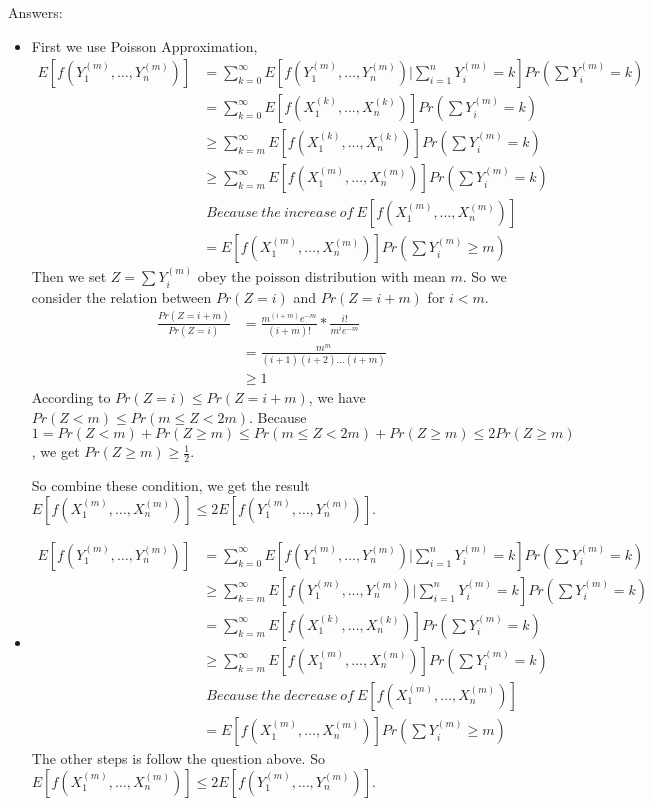 \documentclass[12pt]{article}
\begin{document}
Answers:
\begin{itemize}
\item First we use Poisson Approximation,
\begin{equation}
    \begin{split}
    E[f(Y_1^{(m)}, \dots, Y_n^{(m)})] &= \sum_{k=0}^{\infty} E[f(Y_1^{(m)}, \dots, Y_n^{(m)}) | \sum_{i=1}^{n}Y_{i}^{(m)}=k] Pr(\sum Y_i^{(m)} = k)\\
    &= \sum_{k=0}^{\infty} E[f(X_1^{(k)}, \dots, X_n^{(k)})] Pr(\sum Y_i^{(m)} = k)\\
    &\ge \sum_{k=m}^{\infty} E[f(X_1^{(k)}, \dots, X_n^{(k)})] Pr(\sum Y_i^{(m)} = k)\\
    &\ge \sum_{k=m}^{\infty} E[f(X_1^{(m)}, \dots, X_n^{(m)})] Pr(\sum Y_i^{(m)} = k) \\
    &\; Because\ the\ increase\ of\ E[f(X_1^{(m)}, \dots, X_n^{(m)})]\\
    &= E[f(X_1^{(m)}, \dots, X_n^{(m)})] Pr(\sum Y_i^{(m)} \ge m)
    \end{split}
\end{equation}
Then we set $Z = \sum Y_i^{(m)}$ obey the poisson distribution with mean $m$. So we consider the relation between $Pr(Z=i)$ and $Pr(Z=i+m)$ for $i<m$.
\begin{equation}
    \begin{split}
    \frac{Pr(Z=i+m)}{Pr(Z=i)} &= \frac{m^(i+m) e^{-m}}{(i+m)!} * \frac{i!}{m^i e^{-m}}\\
    &= \frac{m^m}{(i+1)(i+2)\dots(i+m)} \\
    &\ge 1
    \end{split}
\end{equation}
According to $Pr(Z=i) \le Pr(Z=i+m)$, we have $Pr(Z<m) \le Pr(m \le Z < 2m)$.
Because $1=Pr(Z<m) + Pr(Z\ge m)\le Pr(m \le Z < 2m) + Pr(Z\ge m) \le 2Pr(Z\ge m)$, we get $Pr(Z\ge m) \ge \frac{1}{2}$.

So combine these condition, we get the result $E[f(X_1^{(m)}, \dots, X_n^{(m)})] \le 2E[f(Y_1^{(m)}, \dots, Y_n^{(m)})]$.

\item
\begin{equation}
    \begin{split}
    E[f(Y_1^{(m)}, \dots, Y_n^{(m)})] &= \sum_{k=0}^{\infty} E[f(Y_1^{(m)}, \dots, Y_n^{(m)}) | \sum_{i=1}^{n}Y_{i}^{(m)}=k] Pr(\sum Y_i^{(m)} = k)\\
    &\ge \sum_{k=m}^{\infty} E[f(Y_1^{(m)}, \dots, Y_n^{(m)}) | \sum_{i=1}^{n}Y_{i}^{(m)}=k] Pr(\sum Y_i^{(m)} = k)\\
    &= \sum_{k=m}^{\infty} E[f(X_1^{(k)}, \dots, X_n^{(k)})] Pr(\sum Y_i^{(m)} = k)\\
    &\ge \sum_{k=m}^{\infty} E[f(X_1^{(m)}, \dots, X_n^{(m)})] Pr(\sum Y_i^{(m)} = k) \\
    &\; Because\ the\ decrease\ of\ E[f(X_1^{(m)}, \dots, X_n^{(m)})]\\
    &= E[f(X_1^{(m)}, \dots, X_n^{(m)})] Pr(\sum Y_i^{(m)} \ge m)
    \end{split}
\end{equation}
The other steps is follow the question above. So $E[f(X_1^{(m)}, \dots, X_n^{(m)})] \le 2E[f(Y_1^{(m)}, \dots, Y_n^{(m)})]$.
\end{itemize}
\end{document}
